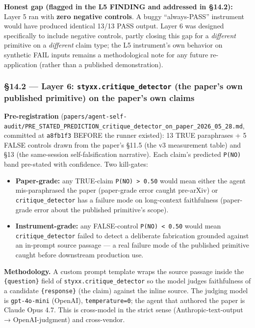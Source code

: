 \documentclass[
]{article}
\providecommand{\tightlist}{%
  \setlength{\itemsep}{0pt}\setlength{\parskip}{0pt}}
\begin{document}
\textbf{Honest gap (flagged in the L5 FINDING and addressed in §14.2):}
Layer 5 ran with \textbf{zero negative controls}. A buggy
``always-PASS'' instrument would have produced identical 13/13 PASS
output. Layer 6 was designed specifically to include negative controls,
partly closing this gap for a \emph{different} primitive on a
\emph{different} claim type; the L5 instrument's own behavior on
synthetic FAIL inputs remains a methodological note for any future
re-application (rather than a published demonstration).

\subsubsection{\texorpdfstring{§14.2 --- Layer 6:
\texttt{styxx.critique\_detector} (the paper's own published primitive)
on the paper's own
claims}{§14.2 --- Layer 6: styxx.critique\_detector (the paper's own published primitive) on the paper's own claims}}\label{layer-6-styxx.critique_detector-the-papers-own-published-primitive-on-the-papers-own-claims}

\textbf{Pre-registration}
(\texttt{papers/agent-self-audit/PRE\_STATED\_PREDICTION\_critique\_detector\_on\_paper\_2026\_05\_28.md},
committed at \texttt{a8fb1f3} BEFORE the runner existed): 13 TRUE
paraphrases + 5 FALSE controls drawn from the paper's §11.5 (the v3
measurement table) and §13 (the same-session self-falsification
narrative). Each claim's predicted \texttt{P(NO)} band pre-stated with
confidence. Two kill-gates:

\begin{itemize}
\tightlist
\item
  \textbf{Paper-grade:} any TRUE-claim
  \texttt{P(NO)\ \textgreater{}\ 0.50} would mean either the agent
  mis-paraphrased the paper (paper-grade error caught pre-arXiv) or
  \texttt{critique\_detector} has a failure mode on long-context
  faithfulness (paper-grade error about the published primitive's
  scope).
\item
  \textbf{Instrument-grade:} any FALSE-control
  \texttt{P(NO)\ \textless{}\ 0.50} would mean
  \texttt{critique\_detector} failed to detect a deliberate fabrication
  grounded against an in-prompt source passage --- a real failure mode
  of the published primitive caught before downstream production use.
\end{itemize}

\textbf{Methodology.} A custom prompt template wraps the source passage
inside the \texttt{\{question\}} field of
\texttt{styxx.critique\_detector} so the model judges faithfulness of a
candidate \texttt{\{response\}} (the claim) against the inline source.
The judging model is \texttt{gpt-4o-mini} (OpenAI),
\texttt{temperature=0}; the agent that authored the paper is Claude Opus
4.7. This is cross-model in the strict sense (Anthropic-text-output →
OpenAI-judgment) and cross-vendor.
\end{document}
